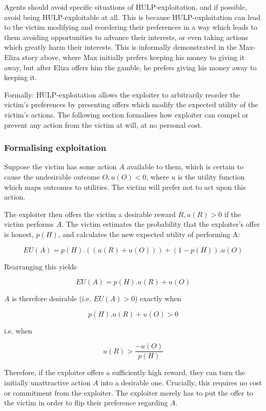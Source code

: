 \documentclass{article}
\begin{document}
Agents should avoid specific situations of HULP-exploitation, and if possible, avoid being HULP-exploitable at all. This is because HULP-exploitation can lead to the victim modifying and reordering their preferences in a way which leads to them avoiding opportunities to advance their interests, or even taking actions which greatly harm their interests. This is informally demonstrated in the Max-Eliza story above, where Max initially prefers keeping his money to giving it away, but after Eliza offers him the gamble, he prefers giving his money away to keeping it.

Formally: HULP-exploitation allows the exploiter to arbitrarily reorder the victim's preferences by presenting offers which modify the expected utility of the victim's actions. The following section formalises how exploiter can compel or prevent any action from the victim at will, at no personal cost. 

\subsubsection{Formalising exploitation}

Suppose the victim has some action \(A\) available to them, which is certain to cause the undesirable outcome \(O, u(O) < 0\), where \(u\) is the utility function which maps outcomes to utilities. The victim will prefer not to act upon this action.

The exploiter then offers the victim a desirable reward \(R, u(R) > 0\) if the victim performs \(A\). The victim estimates the probability that the exploiter's offer is honest, \(p(H)\), and calculates the new expected utility of performing A:

\[EU(A) = p(H).((u(R)+u(O))) + (1-p(H)).u(O)\]

Rearranging this yields

\[EU(A) = p(H).u(R) + u(O)\]

\(A\) is therefore desirable (i.e. \(EU(A)>0\)) exactly when

\[p(H).u(R) + u(O) > 0\]

i.e. when

\[u(R) > \frac{-u(O)}{p(H)}\]

Therefore, if the exploiter offers a sufficiently high reward, they can turn the initially unattractive action \(A\) into a desirable one. Crucially, this requires no cost or commitment from the exploiter. The exploiter merely has to put the offer to the victim in order to flip their preference regarding \(A\).
\end{document}
